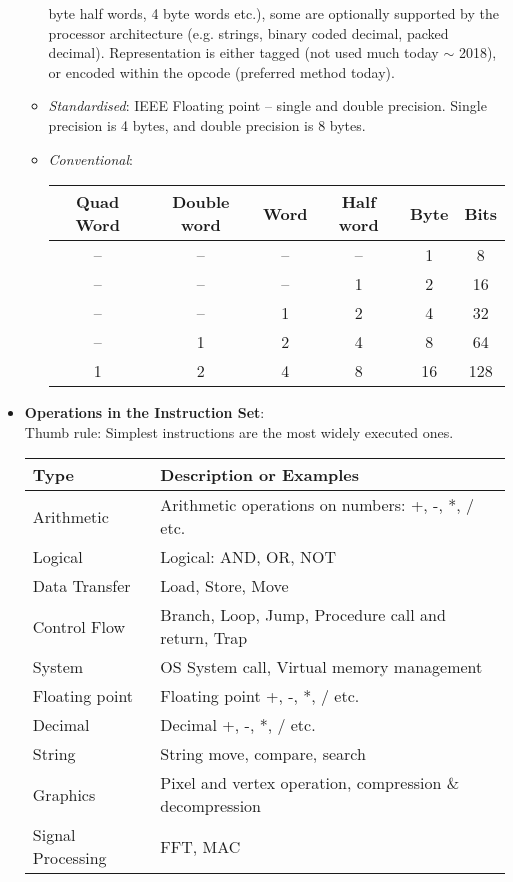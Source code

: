 \begin{itemize}
\begin{itemize}
    byte half words, 4 byte words etc.), some are optionally supported
    by  the  processor  architecture   (e.g.   strings,  binary  coded
    decimal, packed  decimal).  Representation  is either  tagged (not
    used  much  today  $\sim$  2018), or  encoded  within  the  opcode
    (preferred method today).
  \item \emph{Standardised}: IEEE Floating  point -- single and double
    precision.  Single precision is 4 bytes, and double precision is 8
    bytes.
  \item \emph{Conventional}:
    \begin{center}
      \begin{tabular}[h]{|c|c|c|c|c|c|}
        \hline
        Quad Word   & Double word & Word & Half word & Byte & Bits \\
        \hline
        -- & -- & -- & -- & 1 & 8 \\
        -- & -- & -- & 1 & 2 & 16 \\
        -- & -- & 1 & 2 & 4 & 32 \\
        -- & 1 & 2 & 4 & 8 & 64 \\
        1 & 2 & 4 & 8 & 16 & 128 \\
        \hline
      \end{tabular}
    \end{center}
  \end{itemize}
\item \textbf{Operations in the Instruction Set}:\\
  Thumb rule: Simplest instructions are the most widely executed ones.
  \begin{center}
    \begin{tabular}[h]{|l|l|}
      \hline
      \textbf{Type} & \textbf{Description or Examples} \\
      \hline
      Arithmetic & Arithmetic operations on numbers: +, -, *, / etc. \\
      Logical & Logical: AND, OR, NOT \\
      Data Transfer & Load, Store, Move \\
      Control Flow & Branch, Loop, Jump, Procedure call and return,
                     Trap \\
      System & OS System call, Virtual memory management \\
      Floating point & Floating point +, -, *, / etc. \\
      Decimal & Decimal  +, -, *, / etc. \\
      String & String move, compare, search \\
      Graphics & Pixel and vertex operation, compression \&
                 decompression \\
      Signal Processing & FFT, MAC \\
      \hline
    \end{tabular}
  \end{center}


\end{itemize}
